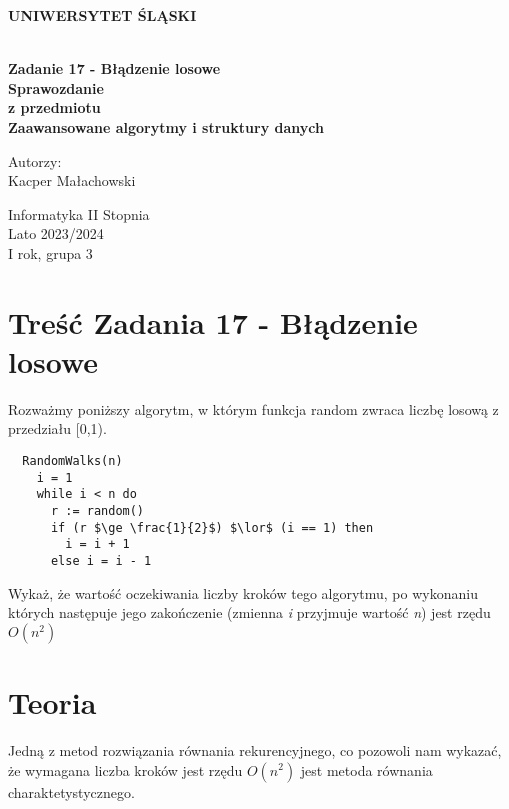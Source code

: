 \documentclass[12pt,oneside,a4paper]{book} %
\theoremstyle{break}
\begin{document}
\thispagestyle{empty}
\begin{center}
  \Large
  \bf{UNIWERSYTET ŚLĄSKI}\\
  \bf{}\\[25mm]
  \large

  \bf{Zadanie 17 - Błądzenie losowe}\\[35mm]

  Sprawozdanie\\
  z przedmiotu\\
  Zaawansowane algorytmy i struktury danych\\[25mm]
\end{center}
\begin{flushright}
  \large
  Autorzy:\\
  Kacper Małachowski\\
\end{flushright}
\vspace*{\fill}
\begin{center}
  Informatyka II Stopnia\\
  Lato 2023/2024\\
  I rok, grupa 3\\[25mm]
\end{center}

\chapter*{Treść Zadania 17 - Błądzenie losowe}

Rozważmy poniższy algorytm, w którym funkcja random zwraca liczbę losową z przedziału [0,1).
\begin{lstlisting}
  RandomWalks(n)
    i = 1
    while i < n do
      r := random()
      if (r $\ge \frac{1}{2}$) $\lor$ (i == 1) then
        i = i + 1
      else i = i - 1
\end{lstlisting}

Wykaż, że wartość oczekiwania liczby kroków tego algorytmu, po wykonaniu których następuje jego zakończenie (zmienna \textit{i} przyjmuje wartość \textit{n}) jest rzędu \textit{$O(n^2)$}

\chapter*{Teoria}

Jedną z metod rozwiązania równania rekurencyjnego, co pozowoli nam wykazać, że wymagana liczba kroków jest rzędu $O(n^2)$ jest metoda równania charaktetystycznego.
\end{document}
